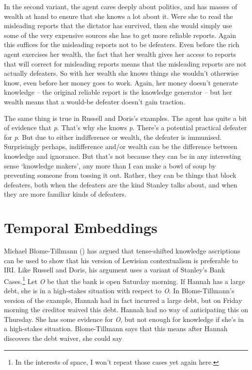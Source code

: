 \documentclass[
  11pt,
  letterpaper,
  DIV=11,
  numbers=noendperiod,
  twoside]{scrartcl}
\begin{document}
In the second variant, the agent cares deeply about politics, and has
masses of wealth at hand to ensure that she knows a lot about it. Were
she to read the misleading reports that the dictator has survived, then
she would simply use some of the very expensive sources she has to get
more reliable reports. Again this suffices for the misleading reports
not to be defeaters. Even before the rich agent exercises her wealth,
the fact that her wealth gives her access to reports that will correct
for misleading reports means that the misleading reports are not
actually defeaters. So with her wealth she knows things she wouldn't
otherwise know, even before her money goes to work. Again, her money
doesn't generate knowledge -- the original reliable report is the
knowledge generator -- but her wealth means that a would-be defeater
doesn't gain traction.

The same thing is true in Russell and Doris's examples. The agent has
quite a bit of evidence that \emph{p}. That's why she knows \emph{p}.
There's a potential practical defeater for \emph{p}. But due to either
indifference or wealth, the defeater is immunised. Surprisingly perhaps,
indifference and/or wealth can be the difference between knowledge and
ignorance. But that's not because they can be in any interesting sense
`knowledge makers', any more than I can make a bowl of soup by
preventing someone from tossing it out. Rather, they can be things that
block defeaters, both when the defeaters are the kind Stanley talks
about, and when they are more familiar kinds of defeaters.

\section{Temporal Embeddings}\label{sect:time}

Michael Blome-Tillmann () has argued that
tense-shifted knowledge ascriptions can be used to show that his version
of Lewisian contextualism is preferable to IRI. Like Russell and Doris,
his argument uses a variant of Stanley's Bank Cases.\footnote{In the
  interests of space, I won't repeat those cases yet again here.} Let
\emph{O} be that the bank is open Saturday morning. If Hannah has a
large debt, she is in a high-stakes situation with respect to \emph{O}.
In Blome-Tillmann's version of the example, Hannah had in fact incurred
a large debt, but on Friday morning the creditor waived this debt.
Hannah had no way of anticipating this on Thursday. She has some
evidence for \emph{O}, but not enough for knowledge if she's in a
high-stakes situation. Blome-Tillmann says that this means after Hannah
discovers the debt waiver, she could say
\end{document}
